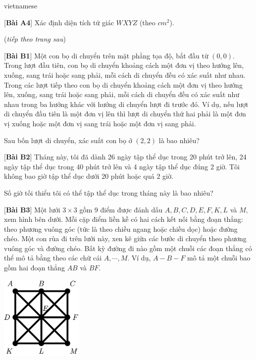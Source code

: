 \documentclass{article}
\begin{document}
\begin{otherlanguage*}{vietnamese}
\begin{problem*}{[\textbf{Bài A4}]}
    Xác định diện tích tứ giác $WXYZ$ (theo $cm^2$).
\end{problem*}

(\textit{tiếp theo trang sau})
\newpage
\begin{problem*}{[\textbf{Bài B1}]}
    Một con bọ di chuyển trên mặt phẳng tọa độ, bắt đầu từ $(0,0).$
    Trong lượt đầu tiên, con bọ di chuyển khoảng cách một đơn vị theo hướng lên, xuống, sang trái hoặc sang phải, mỗi cách di chuyển đều có xác suất như nhau.
    Trong các lượt tiếp theo con bọ di chuyển khoảng cách một đơn vị theo hướng lên, xuống, sang trái hoặc sang phải, mỗi cách di chuyển đều có xác suất như nhau trong ba hướng khác với hướng di chuyển lượt đi trước đó.
    Ví dụ, nếu lượt di chuyển đầu tiên là một đơn vị lên thì lượt di chuyển thứ hai phải là một đơn vị xuống hoặc một đơn vị sang trái hoặc một đơn vị sang phải.
    
    Sau bốn lượt di chuyển, xác suất con bọ ở $(2,2)$ là bao nhiêu?
\end{problem*}

\begin{problem*}{[\textbf{Bài B2}]}
    Tháng này, tôi đã dành 26 ngày tập thể dục trong 20 phút trở lên, 24 ngày tập thể dục trong 40 phút trở lên và 4 ngày tập thể dục đúng 2 giờ. Tôi không bao giờ tập thể dục dưới 20 phút hoặc quá 2 giờ.
    
    Số giờ tối thiểu tôi có thể tập thể dục trong tháng này là bao nhiêu?
\end{problem*}

\begin{problem*}{[\textbf{Bài B3}]}
    Một lưới $3 \times 3$ gồm 9 điểm được đánh dấu $A, B, C, D, E, F, K, L$ và $M,$ xem hình bên dưới.
    Mỗi cặp điểm liền kề có hai cách kết nối bằng đoạn thẳng: theo phương vuông góc (tức là theo chiều ngang hoặc chiều dọc) hoặc đường chéo. 
    Một con rùa đi trên lưới này, xen kẽ giữa các bước di chuyển theo phương vuông góc và đường chéo.
    Bất kỳ đường đi nào gồm một chuỗi các đoạn thẳng  có thể mô tả bằng theo các chữ cái $A, \cdots, M.$
    Ví dụ, $A - B - F$ mô tả một chuỗi bao gồm hai đoạn thẳng $AB$ và $BF.$ 
    \begin{center}
        \includegraphics[width=4cm]{./png/comc-2023-b3.png}
    \end{center}
    

\end{problem*}
\end{otherlanguage*}
\end{document}
